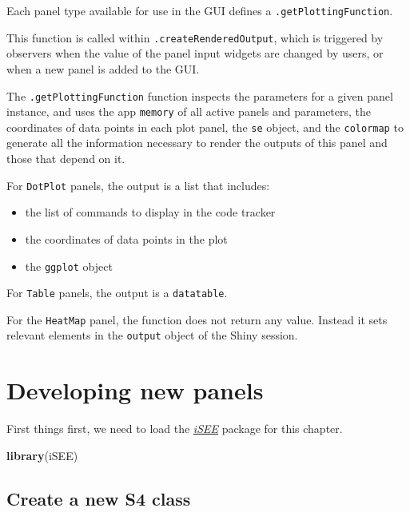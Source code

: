 \documentclass[]{book}
\newenvironment{Shaded}{\begin{snugshade}}{\end{snugshade}}
\newcommand{\KeywordTok}[1]{\textcolor[rgb]{0.13,0.29,0.53}{\textbf{#1}}}
\newcommand{\NormalTok}[1]{#1}
\providecommand{\tightlist}{%
  \setlength{\itemsep}{0pt}\setlength{\parskip}{0pt}}
\begin{document}
Each panel type available for use in the GUI defines a \texttt{.getPlottingFunction}.

This function is called within \texttt{.createRenderedOutput}, which is triggered by observers when the value of the panel input widgets are changed by users, or when a new panel is added to the GUI.

The \texttt{.getPlottingFunction} function inspects the parameters for a given panel instance, and uses the app \texttt{memory} of all active panels and parameters, the coordinates of data points in each plot panel, the \texttt{se} object, and the \texttt{colormap} to generate all the information necessary to render the outputs of this panel and those that depend on it.

For \texttt{DotPlot} panels, the output is a list that includes:

\begin{itemize}
\tightlist
\item
  the list of commands to display in the code tracker
\item
  the coordinates of data points in the plot
\item
  the \texttt{ggplot} object
\end{itemize}

For \texttt{Table} panels, the output is a \texttt{datatable}.

For the \texttt{HeatMap} panel, the function does not return any value.
Instead it sets relevant elements in the \texttt{output} object of the Shiny session.

\hypertarget{developing}{%
\chapter{Developing new panels}\label{developing}}

First things first, we need to load the \emph{\href{https://bioconductor.org/packages/3.11/iSEE}{iSEE}} package for this chapter.

\begin{Shaded}
\begin{Highlighting}[]
\KeywordTok{library}\NormalTok{(iSEE)}
\end{Highlighting}
\end{Shaded}

\hypertarget{create-a-new-s4-class}{%
\section{Create a new S4 class}\label{create-a-new-s4-class}}
\end{document}
